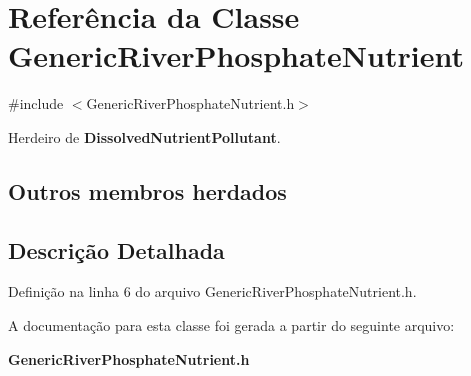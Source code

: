 \section{Referência da Classe Generic\+River\+Phosphate\+Nutrient}
\label{class_generic_river_phosphate_nutrient}


{\ttfamily \#include $<$Generic\+River\+Phosphate\+Nutrient.\+h$>$}



Herdeiro de {\bf Dissolved\+Nutrient\+Pollutant}.

\subsection*{Outros membros herdados}


\subsection{Descrição Detalhada}


Definição na linha 6 do arquivo Generic\+River\+Phosphate\+Nutrient.\+h.



A documentação para esta classe foi gerada a partir do seguinte arquivo\+:\begin{DoxyCompactItemize}
\item 
{\bf Generic\+River\+Phosphate\+Nutrient.\+h}\end{DoxyCompactItemize}
